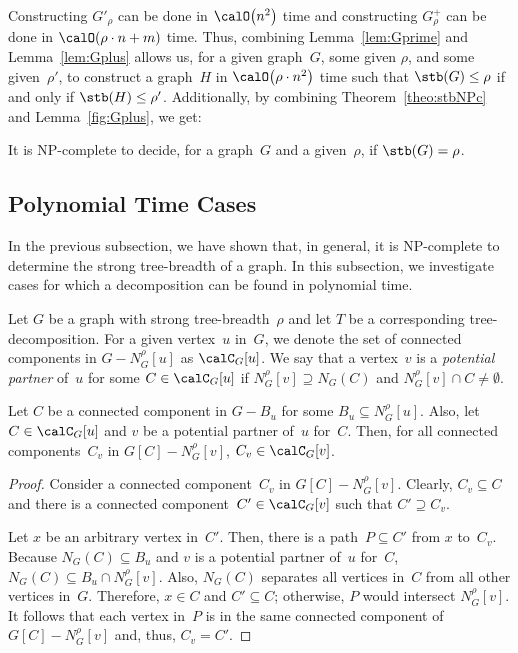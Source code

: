 Constructing $G'_\rho$ can be done in $\calO \big( n^2 \big)$ time and constructing $G_\rho^+$ can be done in $\calO(\rho \cdot n + m)$ time.
Thus, combining Lemma~\ref{lem:Gprime} and Lemma~\ref{lem:Gplus} allows us, for a given graph~$G$, some given $\rho$, and some given~$\rho'$, to construct a graph~$H$ in $\calO \big( \rho \cdot n^2 \big)$ time such that $\stb(G) \leq \rho$ if and only if $\stb(H) \leq \rho'$.
Additionally, by combining Theorem~\ref{theo:stbNPc} and Lemma~\ref{fig:Gplus}, we get:

\begin{theorem}
It is NP-complete to decide, for a graph~\( G \) and a given~\( \rho \), if \( \stb(G) = \rho \).
\end{theorem}


\subsection{Polynomial Time Cases}

In the previous subsection, we have shown that, in general, it is NP-complete to determine the strong tree-breadth of a graph.
In this subsection, we investigate cases for which a decomposition can be found in polynomial time.

Let $G$ be a graph with strong tree-breadth~$\rho$ and let $T$ be a corresponding tree-decomposition.
For a given vertex~$u$ in~$G$, we denote the set of connected components in $G - N_G^\rho[u]$ as $\calC_G[u]$.
We say that a vertex~$v$ is a \emph{potential partner} of~$u$ for some $C \in \calC_G[u]$ if $N_G^\rho[v] \supseteq N_G(C)$ and $N_G^\rho[v] \cap C \neq \emptyset$.

\begin{lemma}
    \label{lem:potPartProp}
Let \( C \) be a connected component in \( G - B_u \) for some \( B_u \subseteq N_G^\rho[u] \).
Also, let \( C \in \calC_G[u] \) and \( v \) be a potential partner of~\( u \) for~\( C \).
Then, for all connected components~\( C_v \) in \( G[C] - N_G^\rho[v] \), \( C_v \in \calC_G[v] \).
\end{lemma}

\begin{proof}
Consider a connected component~$C_v$ in $G[C] - N_G^\rho[v]$.
Clearly, $C_v \subseteq C$ and there is a connected component~$C' \in \calC_G[v]$ such that $C' \supseteq C_v$.

Let $x$ be an arbitrary vertex in~$C'$.
Then, there is a path~$P \subseteq C'$ from $x$ to~$C_v$.
Because $N_G(C) \subseteq B_u$ and $v$ is a potential partner of~$u$ for~$C$, $N_G(C) \subseteq B_u \cap N_G^\rho[v]$.
Also, $N_G(C)$ separates all vertices in~$C$ from all other vertices in~$G$.
Therefore, $x \in C$ and $C' \subseteq C$; otherwise, $P$ would intersect $N_G^\rho[v]$.
It follows that each vertex in~$P$ is in the same connected component of~$G[C] - N_G^\rho[v]$ and, thus, $C_v = C'$.
\end{proof}

